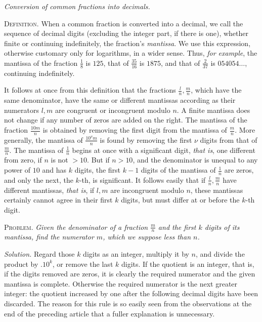 \begin{center}\textit{Conversion of common fractions into decimals.}\end{center}

\textsc{Definition.} When a common fraction is converted into a decimal, we call the sequence of decimal digits (excluding the integer part, if there is one), whether finite or continuing indefinitely, the fraction's \textit{mantissa}. We use this expression, otherwise customary only for logarithms, in a wider sense. Thus, \textit{for example}, the mantissa of the fraction \(\frac18\) is \(125\), that of \(\frac{35}{16}\) is \(1875\), and that of \(\frac2{37}\) is \(054054\ldots\), continuing indefinitely.

It follows at once from this definition that the fractions \(\frac ln,\frac mn\), which have the same denominator, have the same or different mantissas according as their numerators \(l,m\) are congruent or incongruent modulo \(n\). A finite mantissa does not change if any number of zeros are added on the right. The mantissa of the fraction \(\frac{10m}{n}\) is obtained by removing the first digit from the mantissa of \(\frac mn\). More generally, the mantissa of \(\frac{10^\nu m}{n}\) is found by removing the first \(\nu\) digits from that of \(\frac mn\). The mantissa of \(\frac1n\) begins at once with a significant digit, \textit{that is}, one different from zero, if \(n\) is not \(>10\). But if \(n>10\), and the denominator is unequal to any power of \(10\) and has \(k\) digits, the first \(k-1\) digits of the mantissa of \(\frac1n\) are zeros, and only the next, the \(k\)-th, is significant. It follows easily that if \(\frac ln,\frac mn\) have different mantissas, \textit{that is},
if \(l,m\) are incongruent modulo \(n\), these mantissas certainly cannot agree in their first \(k\) digits, but must differ at or before the \(k\)-th digit.

\textsc{Problem.} \textit{Given the denominator of a fraction \(\frac mn\) and the first \(k\) digits of its mantissa, find the numerator \(m\), which we suppose less than \(n\).}

\textit{Solution.} Regard those \(k\) digits as an integer, multiply it by \(n\), and divide the product by \(.10^k\), or remove the last \(k\) digits. If the quotient is an integer, that is, if the digits removed are zeros, it is clearly the required numerator and the given mantissa is complete. Otherwise the required numerator is the next greater integer: the quotient increased by one after the following decimal digits have been discarded. The reason for this rule is so easily seen from the observations at the end of the preceding article that a fuller explanation is unnecessary.

